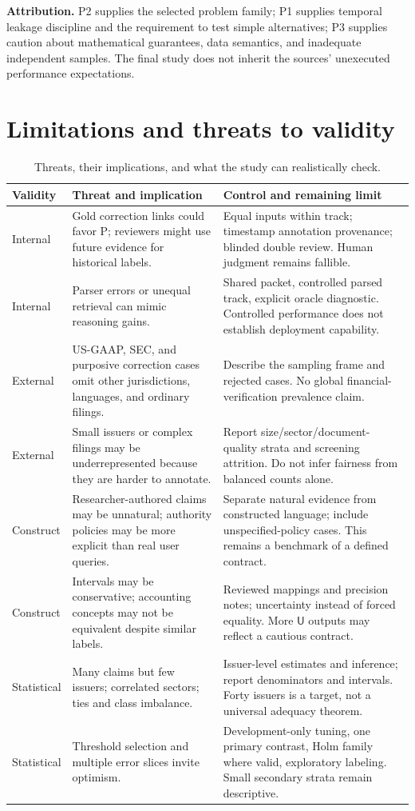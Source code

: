 \documentclass[11pt,a4paper]{article}
\newcommand{\pbreak}{\clearpage}
\newcommand{\lead}[1]{\textbf{\color{navy}#1}}
\newcommand{\Ulabel}{\mathsf{U}}
\begin{document}
\lead{Attribution.} P2 supplies the selected problem family; P1 supplies temporal leakage discipline and the requirement to test simple alternatives; P3 supplies caution about mathematical guarantees, data semantics, and inadequate independent samples. The final study does not inherit the sources' unexecuted performance expectations.

\pbreak
\section{Limitations and threats to validity}
\begin{table}[H]\caption{Threats, their implications, and what the study can realistically check.}
\small\begin{tabularx}{\linewidth}{p{.15\linewidth}YY}\toprule
Validity & Threat and implication & Control and remaining limit\\\midrule
Internal & Gold correction links could favor P; reviewers might use future evidence for historical labels. & Equal inputs within track; timestamp annotation provenance; blinded double review. Human judgment remains fallible.\\
Internal & Parser errors or unequal retrieval can mimic reasoning gains. & Shared packet, controlled parsed track, explicit oracle diagnostic. Controlled performance does not establish deployment capability.\\
External & US-GAAP, SEC, and purposive correction cases omit other jurisdictions, languages, and ordinary filings. & Describe the sampling frame and rejected cases. No global financial-verification prevalence claim.\\
External & Small issuers or complex filings may be underrepresented because they are harder to annotate. & Report size/sector/document-quality strata and screening attrition. Do not infer fairness from balanced counts alone.\\
Construct & Researcher-authored claims may be unnatural; authority policies may be more explicit than real user queries. & Separate natural evidence from constructed language; include unspecified-policy cases. This remains a benchmark of a defined contract.\\
Construct & Intervals may be conservative; accounting concepts may not be equivalent despite similar labels. & Reviewed mappings and precision notes; uncertainty instead of forced equality. More $\Ulabel$ outputs may reflect a cautious contract.\\
Statistical & Many claims but few issuers; correlated sectors; ties and class imbalance. & Issuer-level estimates and inference; report denominators and intervals. Forty issuers is a target, not a universal adequacy theorem.\\
Statistical & Threshold selection and multiple error slices invite optimism. & Development-only tuning, one primary contrast, Holm family where valid, exploratory labeling. Small secondary strata remain descriptive.\\\bottomrule
\end{tabularx}\end{table}
\end{document}
